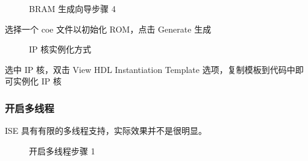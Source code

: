 \documentclass[hyperref,UTF8,12pt,a4paper]{ctexart}
\begin{document}
\begin{figure}[H]
\centering
{}
\caption{BRAM 生成向导步骤 4}
\end{figure}

选择一个 coe 文件以初始化 ROM，点击 Generate 生成

\begin{figure}[H]
\centering
{}
\caption{IP 核实例化方式}
\end{figure}

选中 IP 核，双击 View HDL Instantiation Template
选项，复制模板到代码中即可实例化 IP 核

\hypertarget{ux5f00ux542fux591aux7ebfux7a0b}{%
\subsubsection{开启多线程}\label{ux5f00ux542fux591aux7ebfux7a0b}}

ISE 具有有限的多线程支持，实际效果并不是很明显。

\begin{figure}[H]
\centering
{}
\caption{开启多线程步骤 1}
\end{figure}
\end{document}
